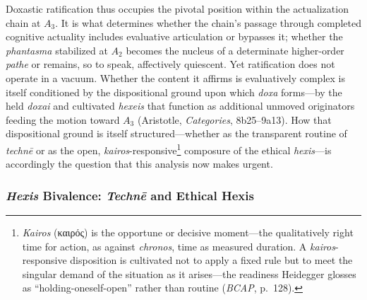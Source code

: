 \documentclass{article}
\newcommand{\gk}[1]{{\greekfont #1}}
\begin{document}
Doxastic ratification thus occupies the pivotal position within the actualization chain at $A_3$. It is what determines whether the chain's passage through completed cognitive actuality includes evaluative articulation or bypasses it; whether the \textit{phantasma} stabilized at $A_2$ becomes the nucleus of a determinate higher-order \textit{pathe} or remains, so to speak, affectively quiescent. Yet ratification does not operate in a vacuum. Whether the content it affirms is evaluatively complex is itself conditioned by the dispositional ground upon which \textit{doxa} forms---by the held \textit{doxai} and cultivated \textit{hexeis} that function as additional unmoved originators feeding the motion toward $A_3$ (Aristotle, \textit{Categories}, 8b25--9a13). How that dispositional ground is itself structured---whether as the transparent routine of \textit{technē} or as the open, \textit{kairos}-responsive\footnote{\textit{Kairos} (\gk{καιρός}) is the opportune or decisive moment---the qualitatively right time for action, as against \textit{chronos}, time as measured duration. A \textit{kairos}-responsive disposition is cultivated not to apply a fixed rule but to meet the singular demand of the situation as it arises---the readiness Heidegger glosses as ``holding-oneself-open'' rather than routine (\textit{BCAP}, p.~128).} composure of the ethical \textit{hexis}---is accordingly the question that this analysis now makes urgent.


\subsubsection*{\textit{Hexis} Bivalence: \textit{Technē} and Ethical Hexis}
\end{document}
